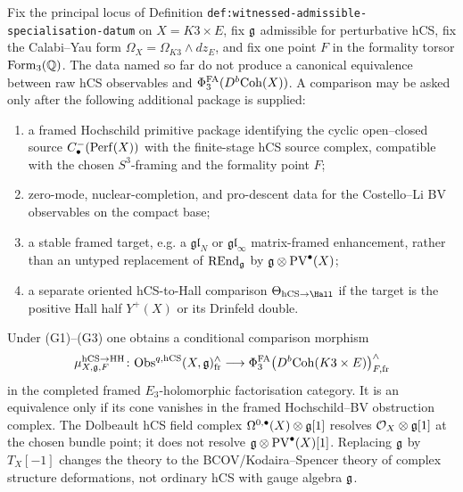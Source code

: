 \begin{theorem}
\label{thm:agent06-cat-eq-BV-K3xE}
Fix the principal locus of Definition
\texttt{def:witnessed-admissible-specialisation-datum} on $X = K3 \times E$,
fix $\mathfrak g$ admissible for perturbative hCS, fix the Calabi--Yau form
$\Omega_X = \Omega_{K3} \wedge dz_E$, and fix one point $F$ in the
formality torsor $\mathrm{Form}_3(\mathbb Q)$. The data named so far do not
produce a canonical equivalence between raw hCS observables and
$\Phi^{\mathrm{FA}}_3(D^b\mathrm{Coh}(X))$. A comparison may be asked only after the
following additional package is supplied:
\begin{enumerate}[label=\textup{(G\arabic*)}]
\item a framed Hochschild primitive package identifying the cyclic
open--closed source
$C^-_\bullet(\mathrm{Perf}(X))$ with the finite-stage hCS source complex,
compatible with the chosen $S^3$-framing and the formality point $F$;
\item zero-mode, nuclear-completion, and pro-descent data for the
Costello--Li BV observables on the compact base;
\item a stable framed target, e.g. a $\mathfrak{gl}_N$ or
$\mathfrak{gl}_\infty$ matrix-framed enhancement, rather than an
untyped replacement of $\mathrm{REnd}_\mathfrak g$ by
$\mathfrak g\otimes\mathrm{PV}^\bullet(X)$;
\item a separate oriented hCS-to-Hall comparison
$\Theta_{\hCS\to\Hall}$ if the target is the positive Hall half
$Y^+(X)$ or its Drinfeld double.
\end{enumerate}
Under \textup{(G1)--(G3)} one obtains a conditional comparison morphism
\begin{equation}
\label{eq:agent06-master-gate}
 \mu^{\mathrm{hCS} \to \mathrm{HH}}_{X,\mathfrak g,F}\colon
 \mathrm{Obs}^{q,\mathrm{hCS}}(X,\mathfrak g)^{\wedge}_{\mathrm{fr}}
 \longrightarrow
 \Phi^{\mathrm{FA}}_3\bigl(D^b\mathrm{Coh}(K3 \times E)\bigr)^{\wedge}_{F,\mathrm{fr}}
\end{equation}
in the completed framed $E_3$-holomorphic factorisation category. It
is an equivalence only if its cone vanishes in the framed
Hochschild--BV obstruction complex. The Dolbeault hCS field complex
$\Omega^{0,\bullet}(X)\otimes\mathfrak g[1]$ resolves
$\mathcal O_X\otimes\mathfrak g[1]$ at the chosen bundle point; it does not resolve
$\mathfrak g\otimes\mathrm{PV}^\bullet(X)[1]$. Replacing $\mathfrak g$ by $T_X[-1]$
changes the theory to the BCOV/Kodaira--Spencer theory of complex
structure deformations, not ordinary hCS with gauge algebra $\mathfrak g$.
\end{theorem}

